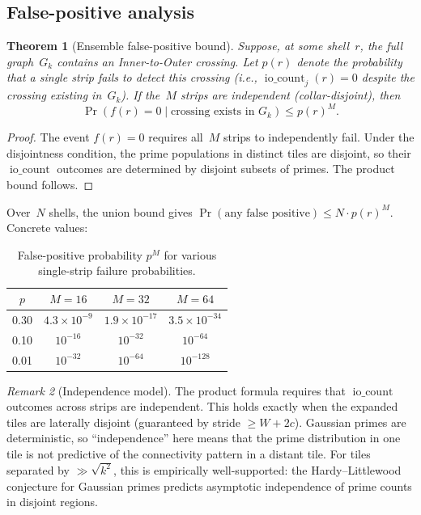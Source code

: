 \documentclass[11pt,a4paper]{article}
\newcommand{\Gk}{G_k}
\newcommand{\fr}{f(r)}
\newcommand{\iocount}{\operatorname{io\_count}}
\theoremstyle{definition}
\theoremstyle{plain}
\newtheorem{theorem}{Theorem}[section]
\theoremstyle{remark}
\newtheorem{remark}[theorem]{Remark}
\begin{document}
\subsection{False-positive analysis}

\begin{theorem}[Ensemble false-positive bound]\label{thm:fp-bound}
Suppose, at some shell~$r$, the full graph~$\Gk$ contains an Inner-to-Outer crossing.  Let $p(r)$ denote the probability that a single strip fails to detect this crossing (i.e., $\iocount_j(r) = 0$ despite the crossing existing in~$\Gk$).  If the~$M$ strips are independent (collar-disjoint), then
\[
  \Pr(\fr = 0 \mid \text{crossing exists in } \Gk) \le p(r)^M.
\]
\end{theorem}

\begin{proof}
The event $\fr = 0$ requires all~$M$ strips to independently fail.  Under the disjointness condition, the prime populations in distinct tiles are disjoint, so their $\iocount$ outcomes are determined by disjoint subsets of primes.  The product bound follows.
\end{proof}

Over~$N$ shells, the union bound gives $\Pr(\text{any false positive}) \le N \cdot p(r)^M$.  Concrete values:

\begin{table}[ht]
\centering
\begin{tabular}{@{}cccc@{}}
\toprule
$p$ & $M = 16$ & $M = 32$ & $M = 64$ \\
\midrule
0.30 & $4.3 \times 10^{-9}$  & $1.9 \times 10^{-17}$ & $3.5 \times 10^{-34}$ \\
0.10 & $10^{-16}$            & $10^{-32}$            & $10^{-64}$ \\
0.01 & $10^{-32}$            & $10^{-64}$            & $10^{-128}$ \\
\bottomrule
\end{tabular}
\caption{False-positive probability $p^M$ for various single-strip failure probabilities.}
\label{tab:fp-bounds}
\end{table}

\begin{remark}[Independence model]\label{rem:independence}
The product formula requires that $\iocount$ outcomes across strips are independent.  This holds exactly when the expanded tiles are laterally disjoint (guaranteed by stride $\ge W + 2c$).  Gaussian primes are deterministic, so ``independence'' here means that the prime distribution in one tile is not predictive of the connectivity pattern in a distant tile.  For tiles separated by $\gg \sqrt{k^2}$, this is empirically well-supported: the Hardy--Littlewood conjecture for Gaussian primes predicts asymptotic independence of prime counts in disjoint regions.
\end{remark}
\end{document}
